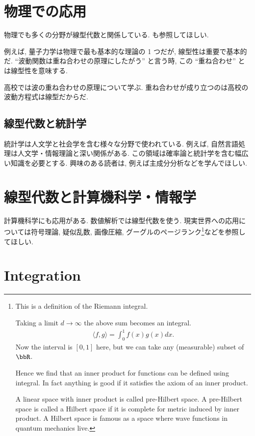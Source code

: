 \documentclass[openany, a4paper, oneside]{jsbook}
\begin{document}
\section{物理での応用}

物理でも多くの分野が線型代数と関係している.
\cite{phasetr2} も参照してほしい.

例えば, 量子力学は物理で最も基本的な理論の 1 つだが,
線型性は重要で基本的だ.
``波動関数は重ね合わせの原理にしたがう'' と言う時,
この ``重ね合わせ'' とは線型性を意味する.

高校では波の重ね合わせの原理について学ぶ.
重ね合わせが成り立つのは高校の波動方程式は線型だからだ.
\subsection{線型代数と統計学}

統計学は人文学と社会学を含む様々な分野で使われている.
例えば, 自然言語処理は人文学・情報理論と深い関係がある.
この領域は確率論と統計学を含む幅広い知識を必要とする.
興味のある読者は, 例えば主成分分析などを学んでほしい.
\section{線型代数と計算機科学・情報学}

計算機科学にも応用がある.
数値解析では線型代数を使う.
現実世界への応用については符号理論, 疑似乱数,
画像圧縮, グーグルのページランク\footnote{This is a definition of the Riemann integral.

Taking a limit $d \to \infty$ the above sum becomes an integral.
\begin{align}
 \langle f, g \rangle
 =
 \int_{0}^{1} f(x) g(x) dx.
\end{align}
Now the interval is $[0, 1]$ here,
but we can take any (measurable) subset of $\bbR$.

Hence we find that an inner product for functions
can be defined using integral.
In fact anything is good if it satisfies the axiom of an inner product.

A linear space with inner product is called pre-Hilbert space.
A pre-Hilbert space is called a Hilbert space if it is complete for metric induced by inner product.
A Hilbert space is famous as a space where wave functions in quantum mechanics live.}などを参照してほしい.
\section{Integration}
\end{document}
